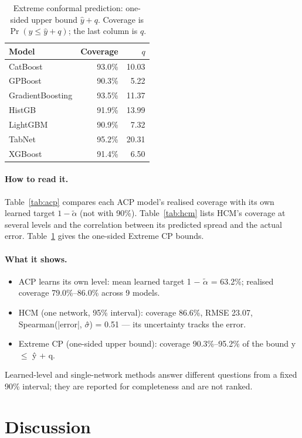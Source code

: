 \documentclass[11pt]{article}
\begin{document}
\begin{table}[t]\centering\small
\caption{Extreme conformal prediction: one-sided upper bound $\hat y+q$. Coverage is $\Pr(y\le\hat y+q)$; the last column is $q$.}\label{tab:extreme}
\begin{tabular}{lrr}\toprule Model & Coverage & $q$\\\midrule
CatBoost & 93.0\% & 10.03\\
GPBoost & 90.3\% & 5.22\\
GradientBoosting & 93.5\% & 11.37\\
HistGB & 91.9\% & 13.99\\
LightGBM & 90.9\% & 7.32\\
TabNet & 95.2\% & 20.31\\
XGBoost & 91.4\% & 6.50\\
\bottomrule\end{tabular}\end{table}
\paragraph{How to read it.} Table~\ref{tab:acp} compares each ACP model's realised coverage with its own learned target $1-\tilde\alpha$ (not with 90\%). Table~\ref{tab:hcm} lists HCM's coverage at several levels and the correlation between its predicted spread and the actual error. Table~\ref{tab:extreme} gives the one-sided Extreme CP bounds.
\paragraph{What it shows.}
\begin{itemize}
\item ACP learns its own level: mean learned target 1 $-$ $\tilde\alpha$ = 63.2\%; realised coverage 79.0\%--86.0\% across 9 models.
\item HCM (one network, 95\% interval): coverage 86.6\%, RMSE 23.07, Spearman(|error|, $\sigma$̂) = 0.51 — its uncertainty tracks the error.
\item Extreme CP (one-sided upper bound): coverage 90.3\%--95.2\% of the bound y $\leq$ ŷ + q.
\end{itemize}
\begin{insight}[Takeaway RQ6]
Learned-level and single-network methods answer different questions from a fixed 90\% interval; they are reported for completeness and are not ranked.
\end{insight}

\FloatBarrier
\section{Discussion}\label{sec:discussion}
\end{document}
